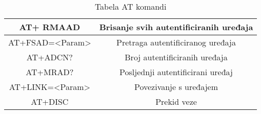 \documentclass[../Document.tex]{subfiles}
\begin{document}
\begin{table}[h]
\begin{tabular}{ |c|c| }
        AT+ RMAAD                         & Brisanje svih autentificiranih uređaja    \\\hline
        AT+FSAD=<Param>                   & Pretraga autentificiranog  uređaja        \\\hline
        AT+ADCN?                          & Broj autentificiranih uređaja             \\\hline
        AT+MRAD?                          & Posljednji autentificirani uređaj         \\\hline
        AT+LINK=<Param>                   & Povezivanje s uređajem                    \\\hline
        AT+DISC                           & Prekid veze                               \\\hline
    \end{tabular}
    \caption{Tabela AT komandi}
    \def\arraystretch{1}
\end{table}
\end{document}

